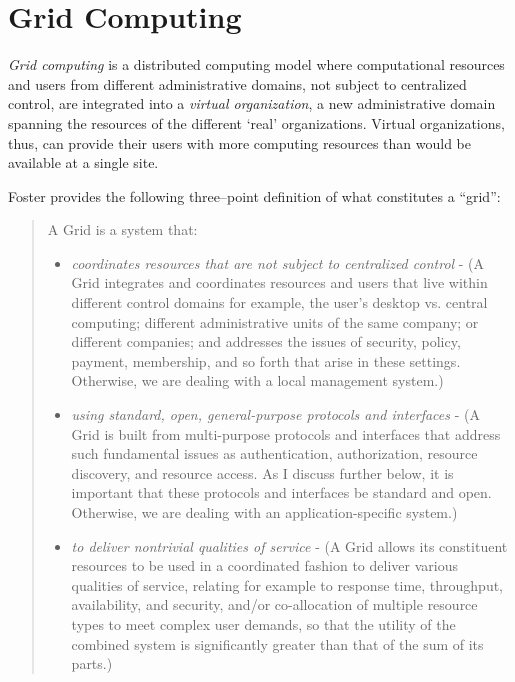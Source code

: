 \documentclass[singlespace]{ccw_chithesis}
\begin{document}
\section{Grid Computing}
\label{sec:grid}

\emph{Grid computing} \cite{gridbook} is a distributed computing model where computational resources and users from different administrative domains, not subject to centralized control, are integrated into a \emph{virtual organization}, a new administrative domain spanning the resources of the different `real' organizations. Virtual organizations, thus, can provide their users with more computing resources than would be available at a single site.

Foster \cite{threepointgrid} provides the following three--point definition of what constitutes a ``grid'':

\begin{quote}
A Grid is a system that:
\begin{itemize}
\item \emph{coordinates resources that are not subject to centralized control} - (A Grid integrates and coordinates resources and users that live within different control domains for example, the user's desktop vs. central computing; different administrative units of the same company; or different companies; and addresses the issues of security, policy, payment, membership, and so forth that arise in these settings. Otherwise, we are dealing with a local management system.)
\item \emph{using standard, open, general-purpose protocols and interfaces} - (A Grid is built from multi-purpose protocols and interfaces that address such fundamental issues as authentication, authorization, resource discovery, and resource access. As I discuss further below, it is important that these protocols and interfaces be standard and open. Otherwise, we are dealing with an application-specific system.)
\item \emph{to deliver nontrivial qualities of service} - (A Grid allows its constituent resources to be used in a coordinated fashion to deliver various qualities of service, relating for example to response time, throughput, availability, and security, and/or co-allocation of multiple resource types to meet complex user demands, so that the utility of the combined system is significantly greater than that of the sum of its parts.)
\end{itemize}
\end{quote} 
\end{document}
